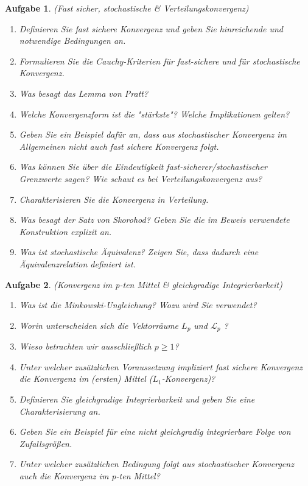 \documentclass[11pt, a4paper, ngerman]{article}
\newtheorem{aufgabe}{Aufgabe}
\begin{document}
\begin{aufgabe} (Fast sicher, stochastische \& Verteilungskonvergenz)
    \begin{enumerate}
        \item 
        Definieren Sie fast sichere Konvergenz und geben Sie hinreichende und notwendige Bedingungen an. 
        \item 
        Formulieren Sie die Cauchy-Kriterien für fast-sichere und für stochastische Konvergenz. 
        \item
        Was besagt das Lemma von Pratt? 
        \item 
        Welche Konvergenzform ist die "stärkste"? Welche Implikationen gelten?  
        \item 
        Geben Sie ein Beispiel dafür an, dass aus stochastischer Konvergenz im Allgemeinen nicht auch fast sichere Konvergenz folgt. 
        \item 
        Was können Sie über die Eindeutigkeit fast-sicherer/stochastischer Grenzwerte sagen? Wie schaut es bei Verteilungskonvergenz aus?
        \item
        Charakterisieren Sie die Konvergenz in Verteilung. 
        \item 
        Was besagt der Satz von Skorohod? Geben Sie die im Beweis verwendete Konstruktion explizit an. 
        \item 
        Was ist stochastische Äquivalenz? Zeigen Sie, dass dadurch eine Äquivalenzrelation definiert ist. 
    \end{enumerate}
\end{aufgabe}

\begin{aufgabe} (Konvergenz im p-ten Mittel \& gleichgradige Integrierbarkeit)
    \begin{enumerate}
        \item 
        Was ist die Minkowski-Ungleichung? Wozu wird Sie verwendet? 
        \item 
        Worin unterscheiden sich die Vektorräume $L_p$ und $\mathcal{L}_p$ ? 
        \item 
        Wieso betrachten wir ausschließlich $p \geq 1$? 
        \item 
        Unter welcher zusätzlichen Voraussetzung impliziert fast sichere Konvergenz die Konvergenz im (ersten) Mittel ($L_1$-Konvergenz)?
        \item 
        Definieren Sie gleichgradige Integrierbarkeit und geben Sie eine Charakterisierung an. 
        \item 
        Geben Sie ein Beispiel für eine nicht gleichgradig integrierbare Folge von Zufallsgrößen. 
        \item 
        Unter welcher zusätzlichen Bedingung folgt aus stochastischer Konvergenz auch die Konvergenz im p-ten Mittel?


    \end{enumerate}
\end{aufgabe}
\end{document}
